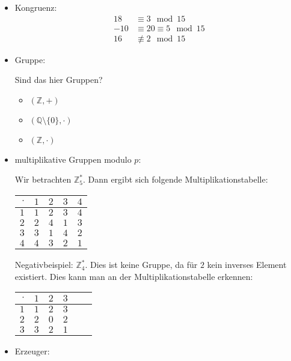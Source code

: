 \documentclass[
  a4paper,
  11pt,
]{article}
\title{}
\author{}
\newcommand{\Q}{\mathbb{Q}}
\newcommand{\Z}{\mathbb{Z}}
\begin{document}
\begin{itemize}
  \item Kongruenz:
    \begin{align*}
      18 & \equiv 3 \mod 15\\
      -10 & \equiv 20 \equiv 5 \mod 15\\
      16 & \not\equiv 2 \mod 15
    \end{align*}

  \item Gruppe:

    Sind das hier Gruppen?
    \begin{itemize}
      \item $(\Z, +)$
      \item $(\Q \setminus \{ 0 \}, \cdot)$
      \item $(\Z, \cdot)$
    \end{itemize}

  \item multiplikative Gruppen modulo $p$:

  Wir betrachten $\Z_5^*$. Dann ergibt sich folgende Multiplikationstabelle:
  \begin{center}
    \begin{tabular}{r|cccc}
      $\cdot$ & $1$ & $2$ & $3$ & $4$\\\hline
        $1$   & $1$ & $2$ & $3$ & $4$\\
        $2$   & $2$ & $4$ & $1$ & $3$\\
        $3$   & $3$ & $1$ & $4$ & $2$\\
        $4$   & $4$ & $3$ & $2$ & $1$
    \end{tabular}
  \end{center}

  Negativbeispiel: $\Z_4^*$. Dies ist keine Gruppe, da für $2$ kein inverses
    Element existiert. Dies kann man an der Multiplikationstabelle erkennen:
  \begin{center}
    \begin{tabular}{r|ccccc}
      $\cdot$ & $1$ & $2$ & $3$\\\hline
      $1$     & $1$ & $2$ & $3$\\
      $2$     & $2$ & $0$ & $2$\\
      $3$     & $3$ & $2$ & $1$
    \end{tabular}
  \end{center}

  \item Erzeuger:


\end{itemize}
\end{document}
